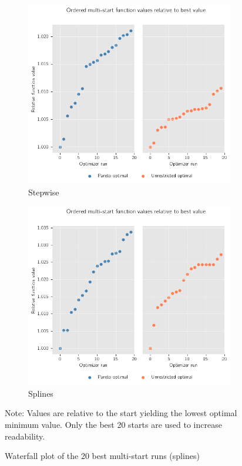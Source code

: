 \begin{figure}[h!]
     \centering
     \begin{subfigure}[b]{0.49\textwidth}
	\centering
	\includegraphics[scale=0.5]{images/piecewise_waterfall.png}

	\caption{Stepwise}
	\label{fig:results_piecewise_waterfall}
     \end{subfigure}
     \hfill
     \begin{subfigure}[b]{0.49\textwidth}
	\centering
	\includegraphics[scale=0.5]{images/splines_waterfall.png}
	\caption{Splines}
	\label{fig:results_splines_waterfall}
     \end{subfigure}
\begin{flushleft}
\scriptsize{Note:} Values are relative to the start yielding the lowest optimal minimum value. Only 	the best 20 starts are used to increase readability. 
\end{flushleft}
        \caption{Waterfall plot of the 20 best multi-start runs (splines)}
        \label{fig:histograms} 
\end{figure}
